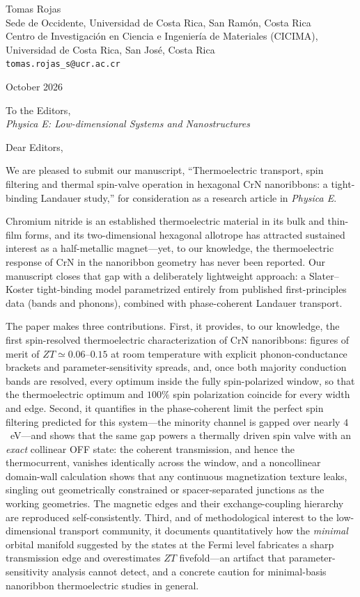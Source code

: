 \documentclass[11pt]{article}
\begin{document}
\noindent Tomas Rojas\\
Sede de Occidente, Universidad de Costa Rica, San Ram\'on, Costa Rica\\
Centro de Investigaci\'on en Ciencia e Ingenier\'ia de Materiales (CICIMA),\\
Universidad de Costa Rica, San Jos\'e, Costa Rica\\
\texttt{tomas.rojas\_s@ucr.ac.cr}

\vspace{1em}
 October 2026

\vspace{1em}
\noindent To the Editors,\\
\textit{Physica E: Low-dimensional Systems and Nanostructures}

\vspace{1em}
\noindent Dear Editors,

We are pleased to submit our manuscript, ``Thermoelectric transport, spin filtering and
thermal spin-valve operation in hexagonal CrN nanoribbons: a tight-binding Landauer study,''
for consideration as a research article in \textit{Physica E}.

Chromium nitride is an established thermoelectric material in its bulk and thin-film forms, and
its two-dimensional hexagonal allotrope has attracted sustained interest as a half-metallic
magnet---yet, to our knowledge, the thermoelectric response of CrN in the nanoribbon geometry
has never been reported. Our manuscript closes that gap with a deliberately lightweight
approach: a Slater--Koster tight-binding model parametrized entirely from published
first-principles data (bands and phonons), combined with phase-coherent Landauer transport.

The paper makes three contributions. First, it provides, to our knowledge, the first
spin-resolved thermoelectric characterization of CrN nanoribbons: figures of merit of
$ZT\simeq0.06$--$0.15$ at room temperature with explicit phonon-conductance brackets and
parameter-sensitivity spreads, and, once both majority conduction bands are resolved, every
optimum inside the fully spin-polarized window, so that the thermoelectric optimum and
$100\%$ spin polarization coincide for every width and edge. Second, it quantifies in the phase-coherent limit the
perfect spin filtering predicted for this system---the minority channel is gapped over nearly
$4$~eV---and shows that the same gap powers a thermally driven spin valve with an \emph{exact}
collinear OFF state: the coherent transmission, and hence the thermocurrent, vanishes
identically across the window, and a noncollinear domain-wall calculation shows that any
continuous magnetization texture leaks, singling out geometrically constrained or
spacer-separated junctions as the working geometries. The magnetic edges and
their exchange-coupling hierarchy are reproduced self-consistently. Third, and of methodological
interest to the low-dimensional transport community, it documents quantitatively how the
\emph{minimal} orbital manifold suggested by the states at the Fermi level fabricates a sharp
transmission edge and overestimates $ZT$ fivefold---an artifact that
parameter-sensitivity analysis cannot detect, and a concrete caution for minimal-basis
nanoribbon thermoelectric studies in general.
\end{document}

